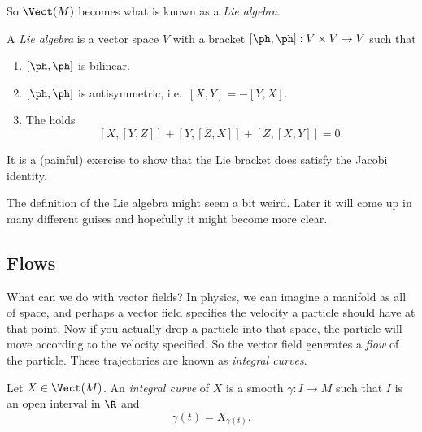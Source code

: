 \documentclass[a4paper]{article}
\begin{document}
So $\Vect(M)$ becomes what is known as a \emph{Lie algebra}.
\begin{defi}
  A \emph{Lie algebra} is a vector space $V$ with a bracket $[\ph, \ph]: V \times V \to V$ such that
  \begin{enumerate}
    \item $[\ph, \ph]$ is bilinear.
    \item $[\ph, \ph]$ is antisymmetric, i.e.\ $[X, Y] = -[Y, X]$.
    \item The  holds
      \[
        [X, [Y, Z]] + [Y, [Z, X]] + [Z, [X, Y]] = 0.
      \]
  \end{enumerate}
\end{defi}

It is a (painful) exercise to show that the Lie bracket does satisfy the Jacobi identity.

The definition of the Lie algebra might seem a bit weird. Later it will come up in many different guises and hopefully it might become more clear.

\subsection{Flows}
What can we do with vector fields? In physics, we can imagine a manifold as all of space, and perhaps a vector field specifies the velocity a particle should have at that point. Now if you actually drop a particle into that space, the particle will move according to the velocity specified. So the vector field generates a \emph{flow} of the particle. These trajectories are known as \emph{integral curves}.

\begin{defi}
  Let $X \in \Vect(M)$. An \emph{integral curve} of $X$ is a smooth $\gamma: I \to M$ such that $I$ is an open interval in $\R$ and
  \[
    \dot{\gamma}(t) = X_{\gamma(t)}.
  \]
\end{defi}
\end{document}
